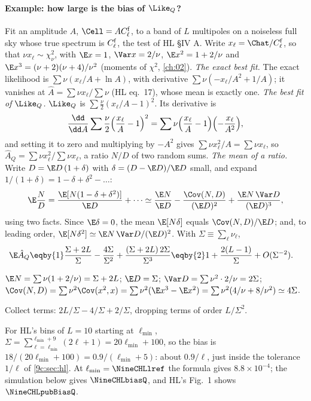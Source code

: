 \paragraph{Example: how large is the bias of $\Like_Q$?} Fit an amplitude $A$, $\Cell=AC^{\rm f}_\ell$, to a
band of $L$ multipoles on a noiseless full sky whose true spectrum is $C^{\rm f}_\ell$, the test of HL
§IV A. Write $x_\ell=\Chat/C^{\rm f}_\ell$, so that $\nu x_\ell\sim\chi^2_\nu$, with $\E x=1$, $\Var x=2/\nu$,
$\E x^2=1+2/\nu$ and $\E x^3=(\nu+2)(\nu+4)/\nu^2$ (moments of $\chi^2$, \cref{ch:02}). \emph{The exact best fit.}
The exact likelihood is $\sum\nu(x_\ell/A+\ln A)$, with derivative $\sum\nu(-x_\ell/A^2+1/A)$; it vanishes at
$\hat A=\sum\nu x_\ell/\sum\nu$ (HL eq.~17), whose mean is exactly one. \emph{The best fit of $\Like_Q$.} $\Like_Q$
is $\sum\frac\nu2(x_\ell/A-1)^2$. Its derivative is
\[
  \frac{\dd}{\dd A}\sum\frac\nu2\Bigl(\frac{x_\ell}{A}-1\Bigr)^2=\sum\nu\Bigl(\frac{x_\ell}{A}-1\Bigr)\Bigl(-\frac{x_\ell}{A^2}\Bigr),
\]
and setting it to zero and multiplying by $-A^2$ gives $\sum\nu x_\ell^2/A=\sum\nu x_\ell$, so
$\hat A_Q=\sum\nu x^2_\ell\big/\sum\nu x_\ell$, a ratio $N/D$ of two random sums. \emph{The mean of a ratio.}
Write $D=\E D\,(1+\delta)$ with $\delta=(D-\E D)/\E D$ small, and expand $1/(1+\delta)=1-\delta+\delta^2-\dots$:
\[
  \E\frac ND=\frac{\E[N(1-\delta+\delta^2)]}{\E D}+\dots
  \simeq\frac{\E N}{\E D}-\frac{\Cov(N,D)}{(\E D)^2}+\frac{\E N\,\Var D}{(\E D)^3},
\]
using two facts. Since $\E\delta=0$, the mean $\E[N\delta]$ equals $\Cov(N,D)/\E D$; and, to leading
order, $\E[N\delta^2]\simeq\E N\,\Var D/(\E D)^2$. With $\Sigma\equiv\sum_\ell\nu_\ell$,
\begin{align}
  \E\hat A_Q
  &\eqby{1}\frac{\Sigma+2L}{\Sigma}-\frac{4\Sigma}{\Sigma^2}+\frac{(\Sigma+2L)\,2\Sigma}{\Sigma^3}
   \eqby{2}1+\frac{2(L-1)}{\Sigma}+O(\Sigma^{-2}).
  \label{9c:eq:AQ-bias}
\end{align}
\begin{explain}
  \item $\E N=\sum\nu(1+2/\nu)=\Sigma+2L$; $\E D=\Sigma$; $\Var D=\sum\nu^2\cdot2/\nu=2\Sigma$;
        $\Cov(N,D)=\sum\nu^2\Cov(x^2,x)=\sum\nu^2(\E x^3-\E x^2)=\sum\nu^2(4/\nu+8/\nu^2)\simeq4\Sigma$.
  \item Collect terms: $2L/\Sigma-4/\Sigma+2/\Sigma$, dropping terms of order $L/\Sigma^2$.
\end{explain}
For HL's bins of $L=10$ starting at $\ell_{\min}$, $\Sigma=\sum_{\ell=\ell_{\min}}^{\ell_{\min}+9}(2\ell+1)=20\ell_{\min}+100$,
so the bias is $18/(20\ell_{\min}+100)=0.9/(\ell_{\min}+5)$: about $0.9/\ell$, just inside the tolerance $1/\ell$ of
\cref{9c:sec:hl}. At $\ell_{\min}=\NineCHLlref$ the formula gives $8.8\times10^{-4}$; the simulation below gives
$\NineCHLbiasQ$, and HL's Fig.~1 shows $\NineCHLpubBiasQ$.

